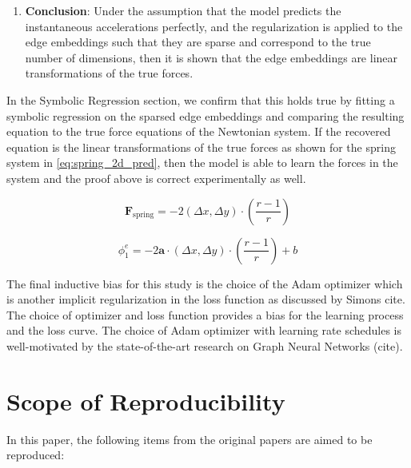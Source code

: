 \documentclass{article}
\begin{document}
\begin{enumerate}
\begin{itemize}
    \end{itemize}

    \item \textbf{Conclusion}:
    Under the assumption that the model predicts the instantaneous accelerations perfectly, and the regularization is applied to the edge embeddings such that they are sparse and correspond to the true number of dimensions, then it is shown that the edge embeddings are linear transformations of the true forces.
\end{enumerate}


In the Symbolic Regression section, we confirm that this holds true by fitting a symbolic regression on the sparsed edge embeddings and comparing the resulting equation to the true force equations of the Newtonian system. If the recovered equation is the linear transformations of the true forces as shown for the spring system in \ref{eq:spring_2d_pred}, then the model is able to learn the forces in the system and the proof above is correct experimentally as well.


\begin{equation}
    \mathbf{F}_{\text{spring}} = -2(\Delta x, \Delta y) \cdot (\frac{r - 1}{r})
    \label{eq:spring_2d_true}
\end{equation}

\begin{equation}
    \phi^e_1 = -2 \mathbf{a} \cdot (\Delta x, \Delta y) \cdot (\frac{r - 1}{r})+b
    \label{eq:spring_2d_pred}
\end{equation}



The final inductive bias for this study is the choice of the Adam optimizer which is another implicit regularization in the loss function as discussed by Simons {cite}. The choice of optimizer and loss function provides a bias for the learning process and the loss curve. The choice of Adam optimizer with learning rate schedules is well-motivated by the state-of-the-art research on Graph Neural Networks (cite).



\section{Scope of Reproducibility}

In this paper, the following items from the original papers are aimed to be reproduced:
\end{document}
